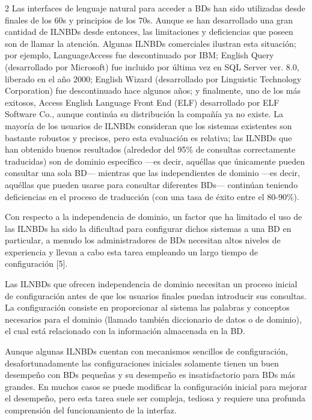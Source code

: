 \documentclass[letterpaper,10pt,final,hyphenatedtitles]{papertexKS}
\begin{document}
\begin{news}{2}
Las interfaces de lenguaje natural para acceder a BDs han sido utilizadas desde finales de los 60s y principios de los 70s. Aunque se han desarrollado una gran cantidad de ILNBDs desde entonces, las limitaciones y deficiencias que poseen son de llamar la atención. Algunas ILNBDs comerciales ilustran esta situación; por ejemplo, LanguageAccess fue descontinuado por IBM; English Query (desarrollado por Microsoft) fue incluido por última vez en SQL Server ver. 8.0, liberado en el año 2000; English Wizard (desarrollado por Linguistic Technology Corporation) fue descontinuado hace algunos años; y finalmente, uno de los más exitosos, Access English Language Front End (ELF) desarrollado por ELF Software Co., aunque continúa su distribución la compañía ya no existe.
La mayoría de los usuarios de ILNBDs consideran que los sistemas existentes son  bastante robustos y precisos, pero esta evaluación es relativa; las ILNBDs que han obtenido buenos resultados (alrededor del 95\% de consultas correctamente traducidas) son de dominio específico ---es decir, aquéllas que  únicamente pueden consultar una sola BD--- mientras que las independientes de dominio ---es decir, aquéllas que pueden usarse para consultar diferentes BDs--- continúan teniendo deficiencias en el proceso de traducción (con una tasa de éxito entre el 80-90\%).

Con respecto a la independencia de dominio, un factor que ha limitado el uso de las ILNBDs ha sido la dificultad para configurar dichos sistemas a una BD en particular, a menudo los administradores de BDs necesitan altos niveles de experiencia y llevan a cabo esta tarea empleando un largo tiempo de configuraci\'on [5]. 

Las ILNBDs que ofrecen independencia de dominio necesitan un proceso inicial de configuración  antes de que los usuarios finales puedan introducir sus consultas. La configuración consiste en proporcionar al sistema las palabras y conceptos necesarios para el dominio (llamado también diccionario de datos o de dominio), el cual está relacionado con la información almacenada en la BD.

Aunque algunas ILNBDs cuentan con mecanismos sencillos de configuración, desafortunadamente las configuraciones iniciales solamente tienen un buen desempeño con BDs pequeñas y su desempeño es insatisfactorio para BDs más grandes. En muchos casos se puede modificar la configuración inicial para mejorar el desempeño, pero esta tarea suele ser compleja, tediosa y requiere una profunda comprensión del funcionamiento de la interfaz.


\end{news}
\end{document}
